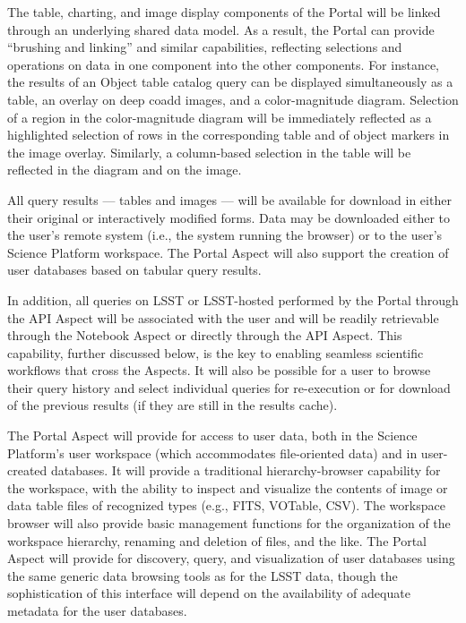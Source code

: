 The table, charting, and image display components of the Portal will be linked through an underlying shared data model.
As a result, the Portal can provide ``brushing and linking'' and similar capabilities, reflecting selections and operations on data in one component into the other components.
For instance, the results of an Object table catalog query can be displayed simultaneously as a table, an overlay on deep coadd images, and a color-magnitude diagram.
Selection of a region in the color-magnitude diagram will be immediately reflected as a highlighted selection of rows in the corresponding table and of object markers in the image overlay.
Similarly, a column-based selection in the table will be reflected in the diagram and on the image.

All query results --- tables and images --- will be available for download in either their original or interactively modified forms.
Data may be downloaded either to the user's remote system (i.e., the system running the browser) or to the user's Science Platform workspace.
The Portal Aspect will also support the creation of user databases based on tabular query results.

In addition, all queries on LSST or LSST-hosted performed by the Portal through the API Aspect will be associated with the user and will be readily retrievable through the Notebook Aspect or directly through the API Aspect.
This capability, further discussed below, is the key to enabling seamless scientific workflows that cross the Aspects.
It will also be possible for a user to browse their query history and select individual queries for re-execution or for download of the previous results (if they are still in the results cache).

The Portal Aspect will provide for access to user data, both in the Science Platform's user workspace (which accommodates file-oriented data) and in user-created databases.
It will provide a traditional hierarchy-browser capability for the workspace, with the ability to inspect and visualize the contents of image or data table files of recognized types (e.g., FITS, VOTable, CSV).
The workspace browser will also provide basic management functions for the organization of the workspace hierarchy, renaming and deletion of files, and the like.
The Portal Aspect will provide for discovery, query, and visualization of user databases using the same generic data browsing tools as for the LSST data, though the sophistication of this interface will depend on the availability of adequate metadata for the user databases.

